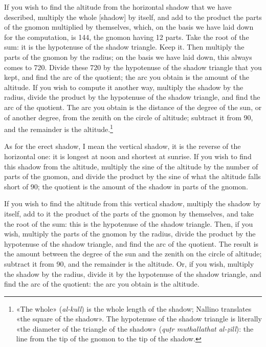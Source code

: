 \documentclass[11pt]{article}
\begin{document}
\par If you wish to find the altitude from the horizontal shadow that we have described, multiply the whole [shadow] by itself, and add to the product the parts of the gnomon multiplied by themselves, which, on the basis we have laid down for the computation, is 144, the gnomon having 12 parts. Take the root of the sum: it is the hypotenuse of the shadow triangle. Keep it. Then multiply the parts of the gnomon by the radius; on the basis we have laid down, this always comes to 720. Divide these 720 by the hypotenuse of the shadow triangle that you kept, and find the arc of the quotient; the arc you obtain is the amount of the altitude. If you wish to compute it another way, multiply the shadow by the radius, divide the product by the hypotenuse of the shadow triangle, and find the arc of the quotient. The arc you obtain is the distance of the degree of the sun, or of another degree, from the zenith on the circle of altitude; subtract it from 90, and the remainder is the altitude.\footnote{«The whole» (\emph{al-kull}) is the whole length of the shadow; Nallino translates «the square of the shadow». The hypotenuse of the shadow triangle is literally «the diameter of the triangle of the shadow» (\emph{quṭr muthallathat al-ẓill}): the line from the tip of the gnomon to the tip of the shadow.}\par
\par As for the erect shadow, I mean the vertical shadow, it is the reverse of the horizontal one: it is longest at noon and shortest at sunrise. If you wish to find this shadow from the altitude, multiply the sine of the altitude by the number of parts of the gnomon, and divide the product by the sine of what the altitude falls short of 90; the quotient is the amount of the shadow in parts of the gnomon.\par
\par If you wish to find the altitude from this vertical shadow, multiply the shadow by itself, add to it the product of the parts of the gnomon by themselves, and take the root of the sum: this is the hypotenuse of the shadow triangle. Then, if you wish, multiply the parts of the gnomon by the radius, divide the product by the hypotenuse of the shadow triangle, and find the arc of the quotient. The result is the amount between the degree of the sun and the zenith on the circle of altitude; subtract it from 90, and the remainder is the altitude. Or, if you wish, multiply the shadow by the radius, divide it by the hypotenuse of the shadow triangle, and find the arc of the quotient: the arc you obtain is the altitude.\par
\end{document}
